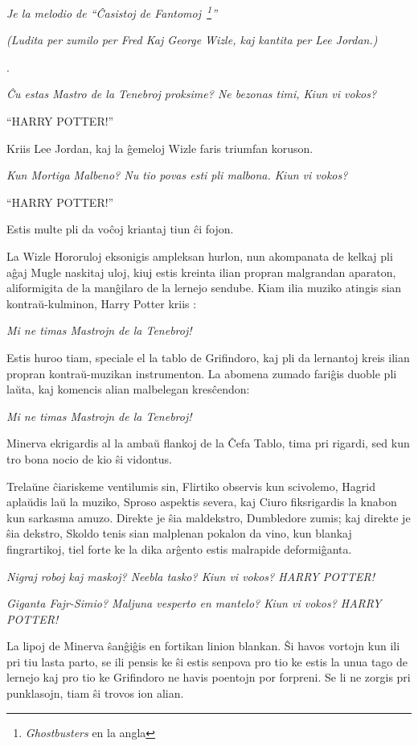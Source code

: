 \emph{Je la melodio de ``Ĉasistoj de Fantomoj~\footnote{\emph{Ghostbusters}
    en la angla}''}

\emph{(Ludita per zumilo per Fred Kaj George Wizle, kaj kantita per
  Lee Jordan.)}

.

\emph{Ĉu estas Mastro de la Tenebroj proksime? Ne bezonas timi, Kiun
  vi vokos?}

``HARRY POTTER!''

Kriis Lee Jordan, kaj la ĝemeloj Wizle faris triumfan koruson.

\emph{Kun Mortiga Malbeno? Nu tio povas esti pli malbona. Kiun vi vokos?}

``HARRY POTTER!''

Estis multe pli da voĉoj kriantaj tiun ĉi fojon.

La Wizle Hororuloj eksonigis ampleksan hurlon, nun akompanata de
kelkaj pli aĝaj Mugle naskitaj uloj, kiuj estis kreinta ilian propran
malgrandan aparaton, aliformigita de la manĝilaro de la lernejo
sendube. Kiam ilia muziko atingis sian kontraŭ-kulminon, Harry Potter
kriis :

\emph{Mi ne timas Mastrojn de la Tenebroj!}

Estis huroo tiam, speciale el la tablo de Grifindoro, kaj pli da
lernantoj kreis ilian propran kontraŭ-muzikan instrumenton. La abomena
zumado fariĝis duoble pli laŭta, kaj komencis alian malbelegan
kresĉendon:

\emph{Mi ne timas Mastrojn de la Tenebroj!}

Minerva ekrigardis al la ambaŭ flankoj de la Ĉefa Tablo, tima pri
rigardi, sed kun tro bona nocio de kio ŝi vidontus.

Trelaŭne ĉiariskeme ventilumis sin, Flirtiko observis kun scivolemo,
Hagrid aplaŭdis laŭ la muziko, Sproso aspektis severa, kaj Ciuro
fiksrigardis la knabon kun sarkasma amuzo. Direkte je ŝia maldekstro,
Dumbledore zumis; kaj direkte je ŝia dekstro, Skoldo tenis sian
malplenan pokalon da vino, kun blankaj fingrartikoj, tiel forte ke la
dika arĝento estis malrapide deformiĝanta.

\emph{Nigraj roboj kaj maskoj? Neebla tasko? Kiun vi vokos?  HARRY
  POTTER!}

\emph{Giganta Fajr-Simio? Maljuna vesperto en mantelo? Kiun vi vokos?
  HARRY POTTER!}

La lipoj de Minerva ŝanĝiĝis en fortikan linion blankan. Ŝi havos
vortojn kun ili pri tiu lasta parto, se ili pensis ke ŝi estis senpova
pro tio ke estis la unua tago de lernejo kaj pro tio ke Grifindoro ne
havis poentojn por forpreni. Se li ne zorgis pri punklasojn, tiam ŝi
trovos ion alian.

